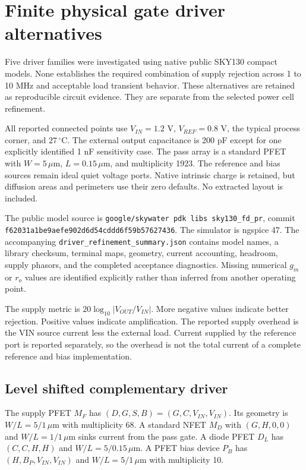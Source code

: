 \section{Finite physical gate driver alternatives}
Five driver families were investigated using native public SKY130 compact models. None establishes the required combination of supply rejection across 1 to 10 MHz and acceptable load transient behavior. These alternatives are retained as reproducible circuit evidence. They are separate from the selected power cell refinement.

All reported connected points use $V_{IN}=1.2$ V, $V_{REF}=0.8$ V, the typical process corner, and $27\,^{\circ}$C. The external output capacitance is 200 pF except for one explicitly identified 1 nF sensitivity case. The pass array is a standard PFET with $W=5\,\mu$m, $L=0.15\,\mu$m, and multiplicity 1923. The reference and bias sources remain ideal quiet voltage ports. Native intrinsic charge is retained, but diffusion areas and perimeters use their zero defaults. No extracted layout is included.

The public model source is \texttt{google/skywater pdk libs sky130\_fd\_pr}, commit \texttt{f62031a1be9aefe902d6d54cddd6f59b57627436}. The simulator is ngspice 47. The accompanying \texttt{driver\_refinement\_summary.json} contains model names, a library checksum, terminal maps, geometry, current accounting, headroom, supply phasors, and the completed acceptance diagnostics. Missing numerical $g_m$ or $r_o$ values are identified explicitly rather than inferred from another operating point.

The supply metric is $20\log_{10}|V_{OUT}/V_{IN}|$. More negative values indicate better rejection. Positive values indicate amplification. The reported supply overhead is the VIN source current less the external load. Current supplied by the reference port is reported separately, so the overhead is not the total current of a complete reference and bias implementation.

\subsection{Level shifted complementary driver}
The supply PFET $M_F$ has $(D,G,S,B)=(G,C,V_{IN},V_{IN})$. Its geometry is $W/L=5/1\,\mu$m with multiplicity 68. A standard NFET $M_D$ with $(G,H,0,0)$ and $W/L=1/1\,\mu$m sinks current from the pass gate. A diode PFET $D_L$ has $(C,C,H,H)$ and $W/L=5/0.15\,\mu$m. A PFET bias device $P_B$ has $(H,B_P,V_{IN},V_{IN})$ and $W/L=5/1\,\mu$m with multiplicity 10.

